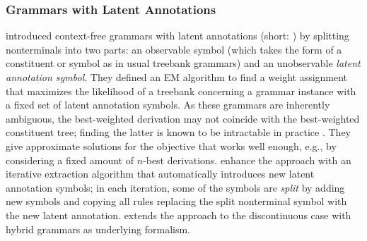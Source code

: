 \documentclass[../document.tex]{subfiles}
\begin{document}
    \subsubsection*{Grammars with Latent Annotations}
    \citet{Mat05} introduced context-free grammars with latent annotations (short: ) by splitting nonterminals into two parts: an observable symbol (which takes the form of a constituent or  symbol as in usual treebank grammars) and an unobservable \emph{latent annotation symbol}.
    They defined an EM algorithm to find a weight assignment that maximizes the likelihood of a treebank concerning a grammar instance with a fixed set of latent annotation symbols.
    As these grammars are inherently ambiguous, the best-weighted derivation may not coincide with the best-weighted constituent tree; finding the latter is known to be intractable in practice \citep[they conclude that finding the best-weighted constituent tree is \emph{NP-hard} in Section 3]{Mat05}.
    They give approximate solutions for the objective that works well enough, e.g.\@, by considering a fixed amount of \(n\)-best derivations.
    \citet{Petrov06} enhance the approach with an iterative extraction algorithm that automatically introduces new latent annotation symbols; in each iteration, some of the symbols are \emph{split} by adding new symbols and copying all rules replacing the split nonterminal symbol with the new latent annotation.
    \citet{Geb20} extends the approach to the discontinuous case with hybrid grammars as underlying formalism.
\end{document}

